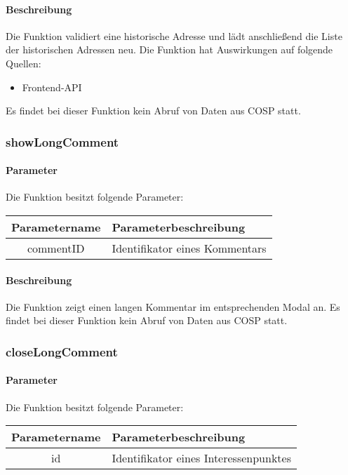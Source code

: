 \paragraph{Beschreibung} Die Funktion validiert eine historische Adresse und lädt anschließend die Liste der historischen Adressen neu. Die Funktion hat Auswirkungen auf folgende Quellen:
\begin{itemize}
	\item Frontend-API
\end{itemize}
Es findet bei dieser Funktion kein Abruf von Daten aus {\glqq COSP\grqq} statt.
\subsubsection{showLongComment}
\paragraph{Parameter} Die Funktion besitzt folgende Parameter:
\begin{table}[H]
	\begin{tabular}{|c|p{11cm}|}
		\hline
		\textbf{Parametername} & \textbf{Parameterbeschreibung} \\ \hline
		commentID & Identifikator eines Kommentars \\ \hline
	\end{tabular}
\end{table}
\paragraph{Beschreibung} Die Funktion zeigt einen langen Kommentar im entsprechenden Modal an. Es findet bei dieser Funktion kein Abruf von Daten aus {\glqq COSP\grqq} statt.
\subsubsection{closeLongComment}
\paragraph{Parameter} Die Funktion besitzt folgende Parameter:
\begin{table}[H]
	\begin{tabular}{|c|p{11cm}|}
		\hline
		\textbf{Parametername} & \textbf{Parameterbeschreibung} \\ \hline
		id & Identifikator eines Interessenpunktes \\ \hline
	\end{tabular}
\end{table}
